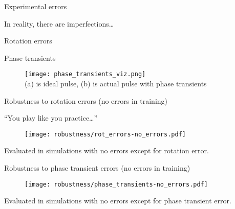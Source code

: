 \documentclass{beamer}
\begin{document}
\begin{frame}{Experimental errors}

In reality, there are imperfections\dots

Rotation errors

\begin{figure}
    \centering
    \scalebox{.6}{
    
    }
\end{figure}

Phase transients

\begin{figure}
    \centering
    \texttt{[image: phase\_transients\_viz.png]} \\
    (a) is ideal pulse, (b) is actual pulse with phase transients
\end{figure}



\end{frame}


\begin{frame}
{Robustness to rotation errors (no errors in training)}

``You play like you practice\dots''

\begin{figure}
    \centering
    \texttt{[image: robustness/rot\_errors-no\_errors.pdf]}
\end{figure}

Evaluated in simulations with no errors except for rotation error.


\end{frame}

\begin{frame}{Robustness to phase transient errors  (no errors in training)}

\begin{figure}
    \centering
    \texttt{[image: robustness/phase\_transients-no\_errors.pdf]}
\end{figure}

Evaluated in simulations with no errors except for phase transient error.

\end{frame}
\end{document}
